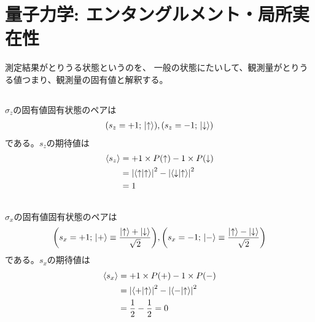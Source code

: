 \documentclass[../../sp_2019.tex]{subfiles}
\begin{document}
\setcounter{section}{0}
\section{量子力学: エンタングルメント・局所実在性}
測定結果がとりうる状態というのを、
一般の状態にたいして、観測量がとりうる値つまり、観測量の固有値と解釈する。
\subsection{}
\(\sigma_z\)の固有値固有状態のペアは
\begin{equation}\begin{aligned}[b]
    \qty(s_z=+1;\,\ket{\uparrow}),
    \qty(s_z=-1;\,\ket{\downarrow})
\end{aligned}\end{equation}
である。\(s_z\)の期待値は
\begin{equation}\begin{aligned}[b]
    \ev{s_z} &= +1\times P(\uparrow)-1\times P(\downarrow) \\
    &= \abs{\braket{\uparrow}{\uparrow}}^2-\abs{\braket{\downarrow}{\uparrow}}^2\\
    &= 1
\end{aligned}\end{equation}

\subsection{}
\(\sigma_x\)の固有値固有状態のペアは
\begin{equation}\begin{aligned}[b]
    \qty(s_x=+1;\,\ket{+}\equiv \frac{\ket{\uparrow}+\ket{\downarrow}}{\sqrt{2}}),
    \qty(s_x=-1;\,\ket{-}\equiv \frac{\ket{\uparrow}-\ket{\downarrow}}{\sqrt{2}})
\end{aligned}\end{equation}
である。\(s_x\)の期待値は
\begin{equation}\begin{aligned}[b]
    \ev{s_x} &= +1\times P(+)-1\times P(-) \\
    &= \abs{\braket{+}{\uparrow}}^2-\abs{\braket{-}{\uparrow}}^2\\
    &= \frac{1}{2}-\frac{1}{2} =0
\end{aligned}\end{equation}
\end{document}
